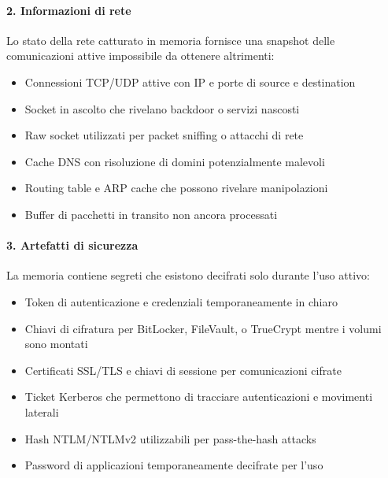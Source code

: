 \paragraph{2. Informazioni di rete}
Lo stato della rete catturato in memoria fornisce una snapshot delle comunicazioni attive impossibile da ottenere altrimenti:
\begin{itemize}
    \item Connessioni TCP/UDP attive con IP e porte di source e destination
    \item Socket in ascolto che rivelano backdoor o servizi nascosti
    \item Raw socket utilizzati per packet sniffing o attacchi di rete
    \item Cache DNS con risoluzione di domini potenzialmente malevoli
    \item Routing table e ARP cache che possono rivelare manipolazioni
    \item Buffer di pacchetti in transito non ancora processati
\end{itemize}

\paragraph{3. Artefatti di sicurezza}
La memoria contiene segreti che esistono decifrati solo durante l'uso attivo:
\begin{itemize}
    \item Token di autenticazione e credenziali temporaneamente in chiaro
    \item Chiavi di cifratura per BitLocker, FileVault, o TrueCrypt mentre i volumi sono montati
    \item Certificati SSL/TLS e chiavi di sessione per comunicazioni cifrate
    \item Ticket Kerberos che permettono di tracciare autenticazioni e movimenti laterali
    \item Hash NTLM/NTLMv2 utilizzabili per pass-the-hash attacks
    \item Password di applicazioni temporaneamente decifrate per l'uso
\end{itemize}

